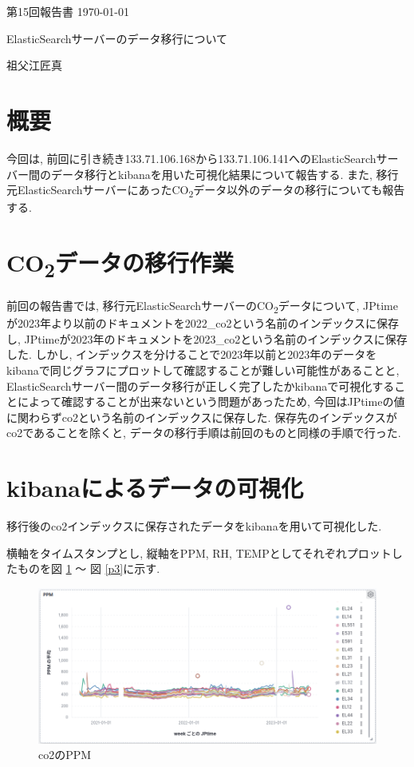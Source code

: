 \documentclass[a4j,12pt,]{jarticle}
\begin{document}
{\noindent\small 第15回報告書 \hfill\today}
\begin{center}
  {\Large ElasticSearchサーバーのデータ移行について}
\end{center}
\begin{flushright}
  祖父江匠真 \\
\end{flushright}

\section{概要}
今回は, 前回に引き続き133.71.106.168から133.71.106.141へのElasticSearchサーバー間のデータ移行とkibanaを用いた可視化結果について報告する.
また, 移行元ElasticSearchサーバーにあったCO\textsubscript{2}データ以外のデータの移行についても報告する.

\section{CO\textsubscript{2}データの移行作業}
前回の報告書では, 移行元ElasticSearchサーバーのCO\textsubscript{2}データについて, JPtimeが2023年より以前のドキュメントを2022\_co2という名前のインデックスに保存し, JPtimeが2023年のドキュメントを2023\_co2という名前のインデックスに保存した.
しかし, インデックスを分けることで2023年以前と2023年のデータをkibanaで同じグラフにプロットして確認することが難しい可能性があることと, ElasticSearchサーバー間のデータ移行が正しく完了したかkibanaで可視化することによって確認することが出来ないという問題があったため, 今回はJPtimeの値に関わらずco2という名前のインデックスに保存した.
保存先のインデックスがco2であることを除くと, データの移行手順は前回のものと同様の手順で行った.

\section{kibanaによるデータの可視化}

移行後のco2インデックスに保存されたデータをkibanaを用いて可視化した.

横軸をタイムスタンプとし, 縦軸をPPM, RH, TEMPとしてそれぞれプロットしたものを図 \ref{p1} 〜 図 \ref{p3}に示す.

\begin{figure}[H]
  \begin{center}
    \includegraphics[width=160mm]{ppm.png}
    \caption{co2のPPM}
    \label{p1}
  \end{center}
\end{figure}
\end{document}
